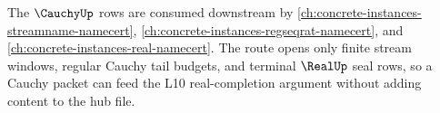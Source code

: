 The $\CauchyUp$ rows are consumed downstream by \autoref{ch:concrete-instances-streamname-namecert}, \autoref{ch:concrete-instances-regseqrat-namecert}, and \autoref{ch:concrete-instances-real-namecert}. The route opens only finite stream windows, regular Cauchy tail budgets, and terminal $\RealUp$ seal rows, so a Cauchy packet can feed the L10 real-completion argument without adding content to the hub file.
